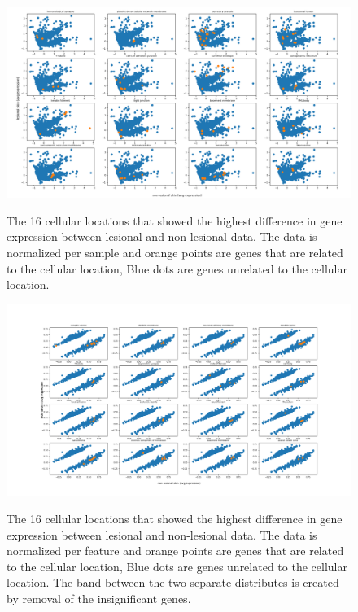 \documentclass[10pt,a4paper]{report}
\begin{document}
	\begin{figure}[H]
		\includegraphics[width=1\textwidth]{Sign_Organelles_Psoriasis.png}
		\label{fig:CellularScaledBySample}
		\caption{The 16 cellular locations that showed the highest difference in gene expression between lesional and non-lesional data. The data is normalized per sample and orange points are genes that are related to the cellular location, Blue dots are genes unrelated to the cellular location.}
	\end{figure}
	
	\begin{figure}[H]
		\includegraphics[width=1\textwidth]{Sign_Organelles_Psoriasis_Scaled.png}
		\label{fig:CellularScaledByFeature1}
		\caption{The 16 cellular locations that showed the highest difference in gene expression between lesional and non-lesional data. The data is normalized per feature and orange points are genes that are related to the cellular location, Blue dots are genes unrelated to the cellular location. The band between the two separate distributes is created by removal of the insignificant genes.}
	\end{figure}
	
\end{document}
